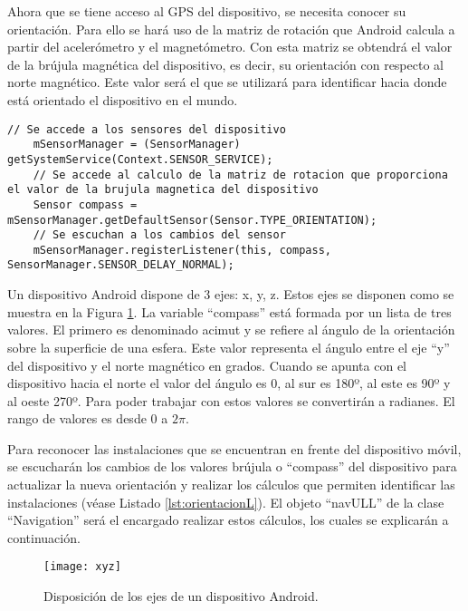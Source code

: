Ahora que se tiene acceso al GPS del dispositivo, se necesita conocer su orientación. Para ello se hará uso de la matriz de rotación que Android calcula a partir del acelerómetro y el magnetómetro. Con esta matriz se obtendrá el valor de la brújula magnética del dispositivo, es decir, su orientación con respecto al norte magnético. Este valor será el que se utilizará para identificar hacia donde está orientado el dispositivo en el mundo.

\begin{lstlisting}[caption={Código para acceder a la última ubicación registrada del GPS.}, label={lst:ubicacionL}]
    // Se accede a los sensores del dispositivo
    mSensorManager = (SensorManager) getSystemService(Context.SENSOR_SERVICE); 
    // Se accede al calculo de la matriz de rotacion que proporciona el valor de la brujula magnetica del dispositivo
    Sensor compass = mSensorManager.getDefaultSensor(Sensor.TYPE_ORIENTATION);
    // Se escuchan a los cambios del sensor
    mSensorManager.registerListener(this, compass, SensorManager.SENSOR_DELAY_NORMAL);    
\end{lstlisting}
 
Un dispositivo Android dispone de 3 ejes: x, y, z. Estos ejes se disponen como se muestra en la Figura \ref{fig:xyz}. La variable ``compass'' está formada por un lista de tres valores. El primero es denominado acimut y se refiere al ángulo de la orientación sobre la superficie de una esfera. Este valor representa el ángulo entre el eje ``y'' del dispositivo y el norte magnético en grados. Cuando se apunta con el dispositivo hacia el norte el valor del ángulo es 0, al sur es 180º, al este es 90º y al oeste 270º. Para poder trabajar con estos valores se convertirán a radianes.  El rango de valores es desde $0$ a $2\pi$.

Para reconocer las instalaciones que se encuentran en frente del dispositivo móvil, se escucharán los cambios de los valores brújula o ``compass'' del dispositivo para actualizar la nueva orientación y realizar los cálculos que permiten identificar las instalaciones (véase Listado \ref{lst:orientacionL}). El objeto ``navULL'' de la clase ``Navigation'' será el encargado realizar estos cálculos, los cuales se explicarán a continuación.


\begin{figure}[h]
    \centering
    \texttt{[image: xyz]}
    \caption{Disposición de los ejes de un dispositivo Android.}
    \label{fig:xyz}
\end{figure}    

